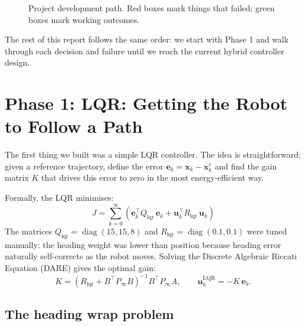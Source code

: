 \documentclass[12pt,a4paper]{article}
\newcommand{\diag}{\operatorname{diag}}
\begin{document}
\begin{figure}[H]
\caption{Project development path. Red boxes mark things that failed;
  green boxes mark working outcomes.}
\label{fig:timeline}
\end{figure}

The rest of this report follows the same order: we start with Phase 1 and
walk through each decision and failure until we reach the current hybrid
controller design.

\section{Phase 1: LQR: Getting the Robot to Follow a Path}

The first thing we built was a simple LQR controller. The idea is
straightforward: given a reference trajectory, define the error
$\mathbf{e}_k = \mathbf{x}_k - \mathbf{x}^r_k$ and find the gain matrix
$K$ that drives this error to zero in the most energy-efficient way.

Formally, the LQR minimises:
\[
  J = \sum_{k=0}^{\infty} \left( \mathbf{e}_k^\top Q_{\text{lqr}}\,
  \mathbf{e}_k + \mathbf{u}_k^\top R_{\text{lqr}}\, \mathbf{u}_k \right)
\]
The matrices $Q_{\text{lqr}} = \diag(15, 15, 8)$ and
$R_{\text{lqr}} = \diag(0.1, 0.1)$ were tuned manually: the heading
weight was lower than position because heading error naturally self-corrects
as the robot moves. Solving the Discrete Algebraic Riccati Equation (DARE)
gives the optimal gain:
\[
  K = (R_{\text{lqr}} + B^\top P_\infty B)^{-1} B^\top P_\infty A, \qquad
  \mathbf{u}_k^{\text{LQR}} = -K\,\mathbf{e}_k.
\]

\subsection{The heading wrap problem}
\end{document}
